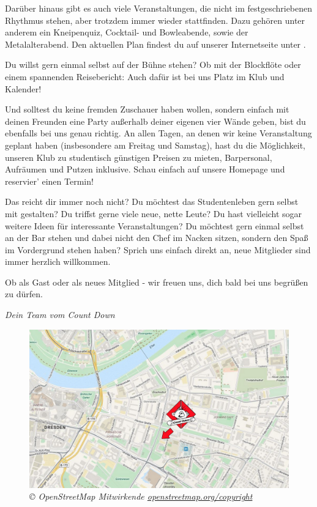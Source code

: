 Darüber hinaus gibt es auch viele Veranstaltungen, die nicht im festgeschriebenen Rhythmus stehen, aber trotzdem immer wieder stattfinden.
Dazu gehören unter anderem ein Kneipenquiz, Cocktail- und Bowleabende, sowie der Metalalterabend.
Den aktuellen Plan findest du auf unserer Internetseite unter .

Du willst gern einmal selbst auf der Bühne stehen?
Ob mit der Blockflöte oder einem spannenden Reisebericht:
Auch dafür ist bei uns Platz im Klub und Kalender!

Und solltest du keine fremden Zuschauer haben wollen, sondern einfach mit deinen Freunden eine Party außerhalb deiner eigenen vier Wände geben, bist du ebenfalls bei uns genau richtig.
An allen Tagen, an denen wir keine Veranstaltung geplant haben (insbesondere am Freitag und Samstag), hast du die Möglichkeit, unseren Klub zu studentisch günstigen Preisen zu mieten, Barpersonal, Aufräumen und Putzen inklusive.
Schau einfach auf unsere Homepage und reservier' einen Termin!

Das reicht dir immer noch nicht?
Du möchtest das Studentenleben gern selbst mit gestalten?
Du triffst gerne viele neue, nette Leute?
Du hast vielleicht sogar weitere Ideen für interessante Veranstaltungen?
Du möchtest gern einmal selbst an der Bar stehen und dabei nicht den Chef im Nacken sitzen, sondern den Spaß im Vordergrund stehen haben?
Sprich uns einfach direkt an, neue Mitglieder sind immer herzlich willkommen.

Ob als Gast oder als neues Mitglied - wir freuen uns, dich bald bei uns begrüßen zu dürfen.

\textit{Dein Team vom Count Down}

\vfill

\begin{figure}[h!]
\centering
\includegraphics[width=\linewidth]{img/lageplancd.png}
\caption*{\small \textit{© OpenStreetMap Mitwirkende \href{https://openstreetmap.org/copyright}{openstreetmap.org/copyright}}}
\end{figure}
